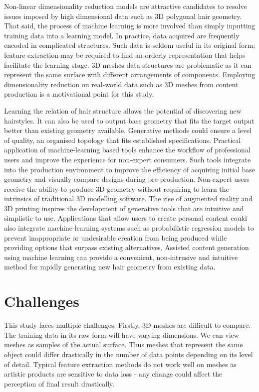 \documentclass[ %
author={Dillon Keith Diep},
supervisor={Dr. Carl Henrik Ek},
degree={MEng},
title={ART-CG Hair:},
subtitle={Assisted Real-time Content Generation of Stylised Virtual Hair},
type={Research},
year={2017} ]{dissertation}
\begin{document}
Non-linear dimensionality reduction models are attractive candidates to resolve issues imposed by high dimensional data such as 3D polygonal hair geometry. That said, the process of machine learning is more involved than simply inputting training data into a learning model. In practice, data acquired are frequently encoded in complicated structures. Such data is seldom useful in its original form; feature extraction may be required to find an orderly representation that helps facilitate the learning stage. 3D meshes data structures are problematic as it can represent the same surface with different arrangements of components. Employing dimensionality reduction on real-world data such as 3D meshes from content production is a motivational point for this study.

Learning the relation of hair structure allows the potential of discovering new hairstyles.  It can also be used to output base geometry that fits the target output better than existing geometry available. Generative methods could ensure a level of quality, an organised topology that fits established specifications. Practical application of machine-learning based tools enhance the workflow of professional users and improve the experience for non-expert consumers. Such tools integrate into the production environment to improve the efficiency of acquiring initial base geometry and visually compare designs during pre-production. Non-expert users receive the ability to produce 3D geometry without requiring to learn the intrinsics of traditional 3D modelling software. The rise of augmented reality and 3D printing inspires the development of generative tools that are intuitive and simplistic to use. Applications that allow users to create personal content could also integrate machine-learning systems such as probabilistic regression models to prevent inappropriate or undesirable creation from being produced while providing options that surpass existing alternatives. Assisted content generation using machine learning can provide a convenient, non-intrusive and intuitive method for rapidly generating new hair geometry from existing data.

\section{Challenges}
This study faces multiple challenges. Firstly, 3D meshes are difficult to compare. The training data in its raw form will have varying dimensions. We can view meshes as samples of the actual surface. Thus meshes that represent the same object could differ drastically in the number of data points depending on its level of detail. Typical feature extraction methods do not work well on meshes as artistic products are sensitive to data loss - any change could affect the perception of final result drastically.
\end{document}
